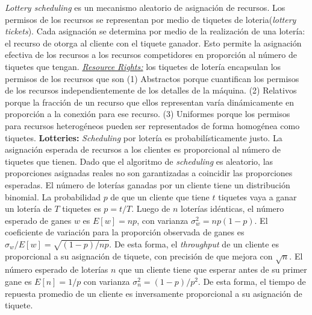 \textit{Lottery scheduling} es un mecanismo aleatorio de asignación de recursos. Los permisos de los recursos se representan por medio de tiquetes de loteria(\textit{lottery tickets}). Cada asignación se determina por medio de la realización de una lotería: el recurso de otorga al cliente con el tiquete ganador. Esto permite la asignación efectiva de los recursos a los recursos competidores en proporción al número de tiquetes que tengan. \underline{\textit{Resource Rights:}} los tiquetes de lotería encapsulan los permisos de los recursos que son (1) Abstractos porque cuantifican los permisos de los recursos independientemente de los detalles de la máquina. (2) Relativos porque la fracción de un recurso que ellos representan varía dinámicamente en proporción a la conexión para ese recurso. (3) Uniformes porque los permisos para recursos heterogéneos pueden ser representados de forma homogénea como tiquetes. \textbf{Lotteries:} \textit{Scheduling} por lotería es probabilísticamente justo. La asignación esperada de recursos a los clientes es proporcional al número de tiquetes que tienen. Dado que el algoritmo de \textit{scheduling} es aleatorio, las proporciones asignadas reales no son garantizadas a coincidir las proporciones esperadas. El número de loterías ganadas por un cliente tiene un distribución binomial. La probabilidad $p$ de que un cliente que tiene $t$ tiquetes vaya a ganar un lotería de $T$ tiquetes es $p = t/T$. Luego de $n$ loterías idénticas, el número esperado de ganes $w$ es $E[w] = np$, con varianza $\sigma^2_{w} = np(1-p)$. El coeficiente de variación para la proporción observada de ganes es $\sigma_w/E[w] = \sqrt{(1-p)/np}$. De esta forma, el \textit{throughput} de un cliente es proporcional a su asignación de tiquete, con precisión de que mejora con $\sqrt{n}$. El número esperado de loterías $n$ que un cliente tiene que esperar antes de su primer gane es $E[n] = 1/p$ con varianza $\sigma^2_{n} = (1-p)/p^2$. De esta forma, el tiempo de repuesta promedio de un cliente es inversamente proporcional a su asignación de tiquete.

